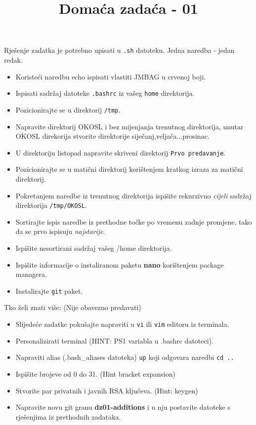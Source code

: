 \documentclass[12pt,a4paper]{article}
\newcommand{\shell}[1]{\texttt{#1}}
\begin{document}
  \title{Domaća zadaća - 01}
  \maketitle
  Rješenje zadatka je potrebno upisati u \shell{.sh} datoteku. Jedna naredba - jedan redak.
  \begin{itemize}
    \item Koristeći naredbu echo ispisati vlastiti JMBAG u crvenoj boji.
    \item Ispisati sadržaj datoteke \shell{.bashrc} iz vašeg \shell{home} direktorija.
    \item Pozicionirajte se u direktorij \shell{/tmp}.
    \item Napravite direktorij OKOSL i bez mijenjanja trenutnog direktorija, unutar OKOSL direkorija stvorite direktorije siječanj,veljača...prosinac.
    \item U direktoriju listopad napravite skriveni direktorij \shell{Prvo predavanje}.
    \item Pozicionirajte se u matični direktorij korištenjem kratkog izraza za matični direktorij.
    \item Pokretanjem naredbe iz trenutnog direktorija ispišite rekurzivno \textit{cijeli} sadržaj direktorija \shell{/tmp/OKOSL}.
    \item Sortirajte ispis naredbe iz prethodne točke po vremenu zadnje promjene, tako da se prvo ispisuju \textit{najstarije}.
    \item Ispišite nesortirani sadržaj vašeg /home direktorija.
    \item Ispišite informacije o instaliranom paketu \textbf{nano} korištenjem package managera.
    \item Instalirajte \shell{git} paket.
  \end{itemize}
  Tko želi znati više: (Nije obavezno predavati)
  \begin{itemize}
    \item Slijedeće zadatke pokušajte napraviti u \shell{vi} ili \shell{vim} editoru iz terminala.
    \item Personalizirati terminal (HINT: PS1 variabla u .bashrc datoteci).
    \item Napraviti alias (.bash\_aliases datoteka) \shell{up} koji odgovara naredbi \shell{cd ..}
    \item Ispišite brojeve od 0 do 31. (Hint bracket expansion)
    \item Stvorite par privatnih i javnih RSA ključeva. (Hint: keygen)
    \item Napravite novu git granu \textbf{dz01-additions} i u nju postavite datoteke s rješenjima iz prethodnih zadataka. 
  \end{itemize}
\end{document}
